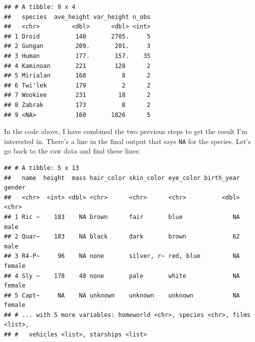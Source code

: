 \documentclass[]{gitbook}
\newenvironment{Shaded}{\begin{snugshade}}{\end{snugshade}}
\newcommand{\DataTypeTok}[1]{\textcolor[rgb]{0.13,0.29,0.53}{#1}}
\newcommand{\DecValTok}[1]{\textcolor[rgb]{0.00,0.00,0.81}{#1}}
\newcommand{\KeywordTok}[1]{\textcolor[rgb]{0.13,0.29,0.53}{\textbf{#1}}}
\newcommand{\NormalTok}[1]{#1}
\newcommand{\OperatorTok}[1]{\textcolor[rgb]{0.81,0.36,0.00}{\textbf{#1}}}
\newcommand{\OtherTok}[1]{\textcolor[rgb]{0.56,0.35,0.01}{#1}}
\newcommand{\StringTok}[1]{\textcolor[rgb]{0.31,0.60,0.02}{#1}}
\theoremstyle{definition}
\theoremstyle{definition}
\theoremstyle{definition}
\theoremstyle{remark}
\begin{document}
\begin{Shaded}
\end{Shaded}

\begin{verbatim}
## # A tibble: 9 x 4
##   species  ave_height var_height n_obs
##   <chr>         <dbl>      <dbl> <int>
## 1 Droid          140       2705.     5
## 2 Gungan         209.       201.     3
## 3 Human          177.       157.    35
## 4 Kaminoan       221        128      2
## 5 Mirialan       168          8      2
## 6 Twi'lek        179          2      2
## 7 Wookiee        231         18      2
## 8 Zabrak         173          8      2
## 9 <NA>           160       1826      5
\end{verbatim}

In the code above, I have combined the two previous steps to get the
result I'm interested in. There's a line in the final output that says
\texttt{NA} for the species. Let's go back to the raw data and find
these lines:

\begin{Shaded}
\end{Shaded}

\begin{verbatim}
## # A tibble: 5 x 13
##   name  height  mass hair_color skin_color eye_color birth_year gender
##   <chr>  <int> <dbl> <chr>      <chr>      <chr>          <dbl> <chr> 
## 1 Ric ~    183    NA brown      fair       blue              NA male  
## 2 Quar~    183    NA black      dark       brown             62 male  
## 3 R4-P~     96    NA none       silver, r~ red, blue         NA female
## 4 Sly ~    178    48 none       pale       white             NA female
## 5 Capt~     NA    NA unknown    unknown    unknown           NA female
## # ... with 5 more variables: homeworld <chr>, species <chr>, films <list>,
## #   vehicles <list>, starships <list>
\end{verbatim}
\end{document}
